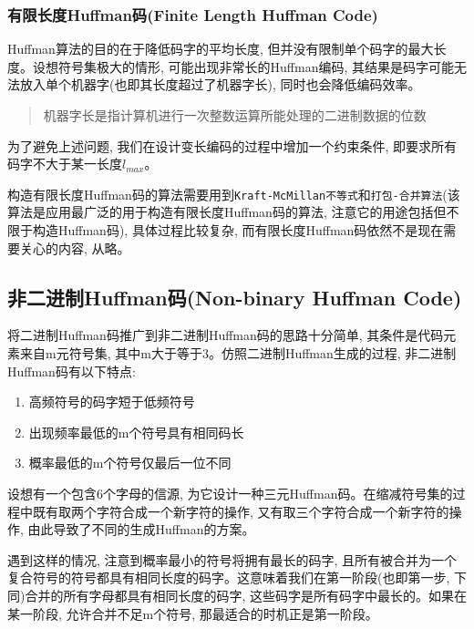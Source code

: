 \documentclass{article}
\begin{document}
\begin{CJK}{UTF8}{gbsn}
\subsubsection{有限长度Huffman码(Finite Length Huffman Code)}\label{header-n526}

Huffman算法的目的在于降低码字的平均长度, 但并没有限制单个码字的最大长度。设想符号集极大的情形,
可能出现非常长的Huffman编码, 其结果是码字可能无法放入单个机器字(也即其长度超过了机器字长), 同时也会降低编码效率。

\begin{quote}
机器字长是指计算机进行一次整数运算所能处理的二进制数据的位数
\end{quote}

为了避免上述问题, 我们在设计变长编码的过程中增加一个约束条件, 即要求所有码字不大于某一长度\(l_{max}\)。

构造有限长度Huffman码的算法需要用到\texttt{Kraft-McMillan不等式}和\texttt{打包-合并算法}(该算法是应用最广泛的用于构造有限长度Huffman码的算法, 注意它的用途包括但不限于构造Huffman码), 具体过程比较复杂, 而有限长度Huffman码依然不是现在需要关心的内容, 从略。

\subsection{非二进制Huffman码(Non-binary Huffman Code)}\label{header-n532}

将二进制Huffman码推广到非二进制Huffman码的思路十分简单, 其条件是代码元素来自m元符号集, 其中m大于等于3。仿照二进制Huffman生成的过程, 非二进制Huffman码有以下特点:

\begin{enumerate}
\def\labelenumi{\arabic{enumi}.}
\item
  高频符号的码字短于低频符号
\item
  出现频率最低的m个符号具有相同码长
\item
  概率最低的m个符号仅最后一位不同
\end{enumerate}

设想有一个包含6个字母的信源, 为它设计一种三元Huffman码。在缩减符号集的过程中既有取两个字符合成一个新字符的操作, 又有取三个字符合成一个新字符的操作, 由此导致了不同的生成Huffman的方案。

遇到这样的情况, 注意到概率最小的符号将拥有最长的码字, 且所有被合并为一个复合符号的符号都具有相同长度的码字。这意味着我们在第一阶段(也即第一步, 下同)合并的所有字母都具有相同长度的码字, 这些码字是所有码字中最长的。如果在某一阶段, 允许合并不足m个符号, 那最适合的时机正是第一阶段。


\end{CJK}
\end{document}
